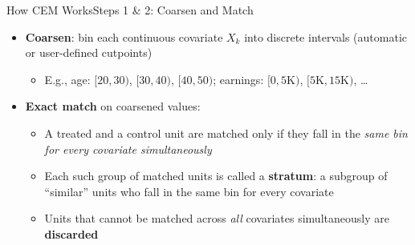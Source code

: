 \documentclass[dvipsnames,hyperref={pdfpagelabels=false}]{beamer}
\begin{document}
\begin{frame}{How CEM Works}{Steps 1 \& 2: Coarsen and Match}
\begin{itemize}
    \item[1] \textbf{Coarsen}: bin each continuous covariate $X_k$
    into discrete intervals (automatic or user-defined cutpoints)
    \vspace{0.2cm}
    \begin{itemize}
        \item E.g., age: $[20,30)$, $[30,40)$, $[40,50)$;
        earnings: $[0, 5\text{K})$, $[5\text{K}, 15\text{K})$, \ldots
    \end{itemize}
    \vspace{0.3cm}
    \item[2] \textbf{Exact match} on coarsened values:
    \vspace{0.2cm}
    \begin{itemize}
        \item A treated and a control unit are matched only if they
        fall in the \emph{same bin for every covariate simultaneously}
        \vspace{0.2cm}
        \item Each such group of matched units is called a
        \textbf{stratum}: a subgroup of ``similar'' units who fall
        in the same bin for every covariate
        \vspace{0.2cm}
        \item Units that cannot be matched across \emph{all}
        covariates simultaneously are \textbf{discarded}
    \end{itemize}
\end{itemize}
\end{frame}
\end{document}
